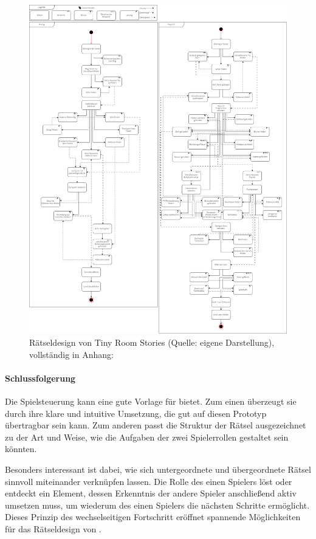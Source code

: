 \begin{figure}[ht]
\centering
\includegraphics[width=1\linewidth]{content/pictures/TinyRoomStoriesUML.png}
\caption{Rätseldesign von Tiny Room Stories (Quelle: eigene Darstellung), vollständig in Anhang: }
\label{fig:trs-uml}
\end{figure}

\paragraph{Schlussfolgerung}
Die Spielsteuerung kann eine gute Vorlage für  bietet. Zum einen überzeugt sie durch ihre klare und intuitive Umsetzung, die gut auf diesen Prototyp übertragbar sein kann. Zum anderen passt die Struktur der Rätsel ausgezeichnet zu der Art und Weise, wie die Aufgaben der zwei Spielerrollen gestaltet sein könnten.

Besonders interessant ist dabei, wie sich untergeordnete und übergeordnete Rätsel sinnvoll miteinander verknüpfen lassen. Die Rolle des einen Spielers löst oder entdeckt ein Element, dessen Erkenntnis der andere Spieler anschließend aktiv umsetzen muss, um wiederum des einen Spielers die nächsten Schritte ermöglicht. Dieses Prinzip des wechselseitigen Fortschritt eröffnet spannende Möglichkeiten für das Rätseldesign von .

